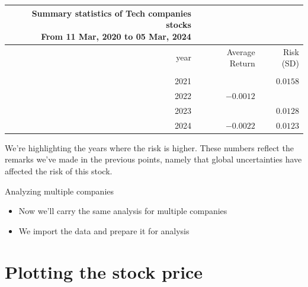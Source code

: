 \documentclass[
  12pt]{article}
\theoremstyle{definition}
\theoremstyle{remark}
\begin{document}
\begin{longtable*}{rrr}
\caption*{
{\large Summary statistics of Tech companies stocks} \\
{\small From 11 Mar, 2020 to 05 Mar, 2024}
} \\
\toprule
year & Average Return & Risk (SD) \\
\midrule{} &  &  \\
2021 &  & $0.0158$ \\
2022 & $-0.0012$ &  \\
2023 &  & $0.0128$ \\
2024 & $-0.0022$ & $0.0123$ \\
\bottomrule
\end{longtable*}

\begin{tcolorbox}[enhanced jigsaw, titlerule=0mm, toptitle=1mm, bottomrule=.15mm, left=2mm, arc=.35mm, colframe=quarto-callout-important-color-frame, rightrule=.15mm, opacityback=0, coltitle=black, colbacktitle=quarto-callout-important-color!10!white, title=\textcolor{quarto-callout-important-color}{\faExclamation}\hspace{0.5em}{Look at the years (again)!}, bottomtitle=1mm, breakable, leftrule=.75mm, colback=white, opacitybacktitle=0.6, toprule=.15mm]

We're highlighting the years where the risk is higher. These numbers
reflect the remarks we've made in the previous points, namely that
global uncertainties have affected the risk of this stock.

\end{tcolorbox}

Analyzing multiple companies

\begin{itemize}
\item
  Now we'll carry the same analysis for multiple companies
\item
  We import the data and prepare it for analysis
\end{itemize}

\section{Plotting the stock price}\label{plotting-the-stock-price}
\end{document}
